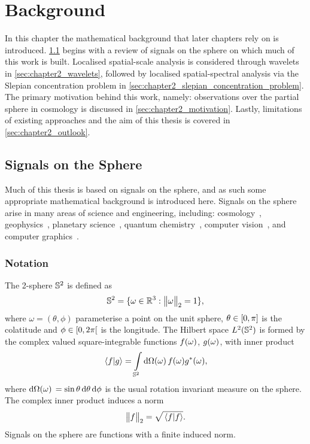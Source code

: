 \chapter{Background}\label{sec:chapter2}

In this chapter the mathematical background that later chapters rely on is introduced.
\cref{sec:chapter2_signals_sphere} begins with a review of signals on the sphere on which much of this work is built.
Localised spatial-scale analysis is considered through wavelets in \cref{sec:chapter2_wavelets}, followed by localised spatial-spectral analysis via the Slepian concentration problem in \cref{sec:chapter2_slepian_concentration_problem}.
The primary motivation behind this work, namely: observations over the partial sphere in cosmology is discussed in \cref{sec:chapter2_motivation}.
Lastly, limitations of existing approaches and the aim of this thesis is covered in \cref{sec:chapter2_outlook}.

\section{Signals on the Sphere}\label{sec:chapter2_signals_sphere}

Much of this thesis is based on signals on the sphere, and as such some appropriate mathematical background is introduced here.
Signals on the sphere arise in many areas of science and engineering, including: cosmology~\cite{Bennett1996}, geophysics~\cite{Simons2006}, planetary science~\cite{Turcotte1981}, quantum chemistry~\cite{Choi1999}, computer vision~\cite{Cohen2018,Esteves2020,Cobb2021}, and computer graphics~\cite{Ramamoorthi2004}.

\subsection{Notation}

The 2-sphere \(\mathbb{S}^{2}{}\) is defined as
%
\begin{equation}
	\mathbb{S}^{2}{}
	= \{\omega \in \mathbb{R}^{3} : {\big\lVert\omega\big\rVert}_{2} = 1\},
\end{equation}
%
where \(\omega=(\theta,\phi)\) parameterise a point on the unit sphere, \(\theta \in \interval{0}{\pi}\) is the colatitude and \(\phi \in \interval[open right]{0}{2\pi}\) is the longitude.
The Hilbert space \(L^{2}(\mathbb{S}^{2})\) is formed by the complex valued square-integrable functions \(f(\omega)\), \(g(\omega)\), with inner product
%
\begin{equation}
	\braket*{f}{g}
	= \displaystyle\int\limits_{\mathbb{S}^{2}} \dd{\Omega(\omega)} f(\omega) g^{\ast}(\omega),
\end{equation}
%
where \(\dd{\Omega(\omega)}{} = \sin{\theta} \dd{\theta} \dd{\phi}\) is the usual rotation invariant measure on the sphere.
The complex inner product induces a norm
%
\begin{equation}
	{\big\lVert f\big\rVert}_{2}
	= \sqrt{\braket*{f}}.
\end{equation}
%
Signals on the sphere are functions with a finite induced norm.

